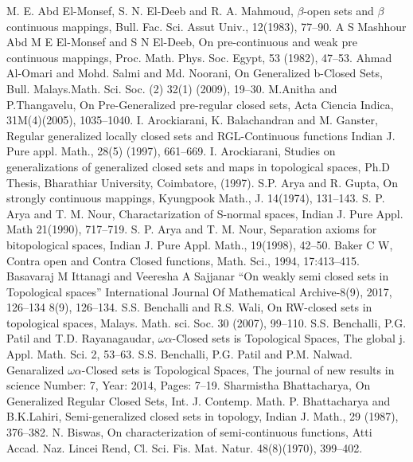 \begin{thebibliography}{99}
 M. E. Abd El-Monsef, S. N. El-Deeb and R. A. Mahmoud, $\beta$-open sets and $\beta$ continuous mappings, Bull. Fac. Sci. Assut Univ., 12(1983), 77--90.
 A S Mashhour Abd M E El-Monsef and S N El-Deeb, On pre-continuous and weak pre continuous mappings, Proc. Math. Phys. Soc. Egypt, 53 (1982), 47--53.
 Ahmad Al-Omari and Mohd. Salmi and Md. Noorani, On Generalized b-Closed Sets, Bull. Malays.Math. Sci. Soc. (2) 32(1) (2009), 19--30.
 M.Anitha and P.Thangavelu, On Pre-Generalized pre-regular closed sets, Acta Ciencia Indica, 31M(4)(2005), 1035--1040.
 I. Arockiarani, K. Balachandran and M. Ganster, Regular generalized locally closed sets and RGL-Continuous functions Indian J. Pure appl. Math., 28(5) (1997), 661--669.
 I. Arockiarani, Studies on generalizations of generalized closed sets and maps in topological spaces, Ph.D Thesis, Bharathiar University, Coimbatore, (1997).
 S.P. Arya and R. Gupta, On strongly continuous mappings, Kyungpook Math., J. 14(1974), 131--143.
 S. P. Arya and T. M. Nour, Charactarization of S-normal spaces, Indian J. Pure Appl. Math  21(1990), 717--719.
 S. P. Arya and T. M. Nour, Separation axioms for bitopological spaces, Indian J. Pure Appl. Math., 19(1998), 42--50.
 Baker C W, Contra open and Contra Closed functions, Math. Sci., 1994, 17:413--415.
 Basavaraj M Ittanagi and Veeresha A Sajjanar ``On weakly semi closed sets in Topological spaces''  International Journal Of Mathematical Archive-8(9), 2017, 126--134 8(9), 126--134.
 S.S. Benchalli and R.S. Wali, On RW-closed sets in topological spaces, Malays. Math. sci. Soc. 30 (2007), 99--110.
 S.S. Benchalli, P.G. Patil and T.D. Rayanagaudar, $\omega\alpha$-Closed sets is Topological Spaces, The global j. Appl. Math. Sci. 2, 53--63.
 S.S. Benchalli, P.G. Patil and P.M. Nalwad. Genaralized  $\omega\alpha$-Closed sets is Topological Spaces, The journal of new results in science Number: 7, Year: 2014, Pages: 7--19.
 Sharmistha Bhattacharya, On Generalized Regular Closed Sets, Int. J. Contemp. Math.  
	P. Bhattacharya and B.K.Lahiri, Semi-generalized closed sets in topology, Indian J. Math., 29 	(1987), 376--382.
 N. Biswas, On characterization of semi-continuous functions, Atti Accad. Naz. Lincei Rend, Cl. Sci. Fis. Mat. Natur. 48(8)(1970), 399--402.

\end{thebibliography}
